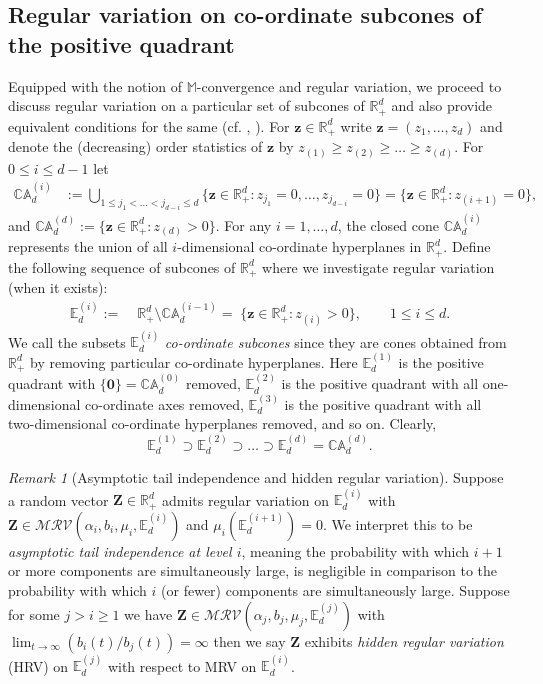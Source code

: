 \documentclass[aos]{imsart}
\numberwithin{equation}{section}
\theoremstyle{plain} %
\theoremstyle{remark}
\newtheorem{remark}[theorem]{Remark}
\newcommand{\E}{\mathbb{E}}
\newcommand{\M}{\mathbb{M}}
\newcommand{\R}{\mathbb{R}}
\def\MRV{\mathcal{MRV}}
\def\bCA{\mathbb{CA}}
\def\bzero{\boldsymbol 0}
\def\bZ{\boldsymbol Z}
\def\bz{\boldsymbol z}
\begin{document}
\subsection{Regular variation on co-ordinate subcones of the positive quadrant}\label{subsec:hrv}
Equipped with the notion of $\M$-convergence and regular variation,  we proceed to discuss regular variation on a particular set of subcones of $\R_+^d$ and also provide equivalent conditions for the same  (cf. \cite{mitra:resnick:2011hrv}, \cite[Section 2]{das:fasen:kluppelberg:2022}). For $\bz\in \R^{d}_+$ write $\bz= (z_{1}, \ldots,z_{d})$ and denote the (decreasing) order statistics  of $\bz$ by $z_{(1)}\ge z_{(2)}\ge \ldots \ge z_{(d)}$. For $0\le i \le d-1$ let
\begin{align*}
    \bCA_d^{(i)} & := \bigcup_{1\le j_{1}<\ldots<j_{d-i} \le d}  \{\bz\in \R^{d}_+: z_{j_{1}}=0,\ldots, z_{j_{d-i}}=0\}
                 = \{\bz\in \R^{d}_+: z_{(i+1)}=0\}, \quad
\end{align*}
and  $\bCA_d^{(d)}:=\{\bz\in \R^d_+: z_{(d)}>0\}$. For any $i=1,\ldots, d$, the closed cone $\bCA^{(i)}_{d}$ represents the union of all $i$-dimensional co-ordinate hyperplanes in $\R^{d}_{+}$.
Define the following sequence of subcones of $\R^d_+$ where we investigate regular variation (when it exists):
{
\begin{align}
\E^{(i)}_{d}  := &\;  \R^d_+ \setminus \bCA^{(i-1)}_{d} = \; \{\bz\in \R^d_+: z_{(i)}>0\}, \quad\quad 1\le i \le d. \label{def:edd}
\end{align}}
 We call the subsets $\E_d^{(i)}$ \emph{co-ordinate subcones} since they are cones obtained from $\R_+^d$ by removing particular co-ordinate hyperplanes. Here $\E^{(1)}_{d}$ is the {positive quadrant} with $\{\bzero\}=\bCA^{(0)}_{d}$ removed, $\E^{(2)}_{d}$ is the {positive quadrant} with all one-dimensional co-ordinate axes removed, $\E^{(3)}_{d}$ is the {positive quadrant} with all two-dimensional co-ordinate hyperplanes removed, and so on.  Clearly,
$$\E^{(1)}_{d} \supset \E^{(2)}_{d} \supset \ldots \supset \E^{(d)}_{d}=\bCA_d^{(d)}.$$
\begin{remark}[Asymptotic tail independence and hidden regular variation]
Suppose a random vector $\bZ\in \R^d_+$ admits regular variation on $\E_d^{(i)}$ with $\bZ\in \MRV(\alpha_i,b_i,\mu_i,\E_d^{(i)})$ and $\mu_i(\E_d^{(i+1)})=0$. We interpret this to be \emph{asymptotic tail independence at level $i$}, meaning the probability with  which $i+1$ or more components are simultaneously large, is negligible in comparison to the probability with  which $i$ (or fewer) components are simultaneously large. Suppose for some $j>i\ge 1$ we have $\bZ\in \MRV(\alpha_j,b_j,\mu_j,\E_d^{(j)})$ with $\lim_{t\to\infty} ({b_i(t)}/{b_j(t)}) =\infty$ then we say $\bZ$ exhibits  \emph{hidden regular variation} (HRV) on $\E_d^{(j)}$ with respect to MRV on $\E_d^{(i)}$.
\end{remark}
\end{document}
